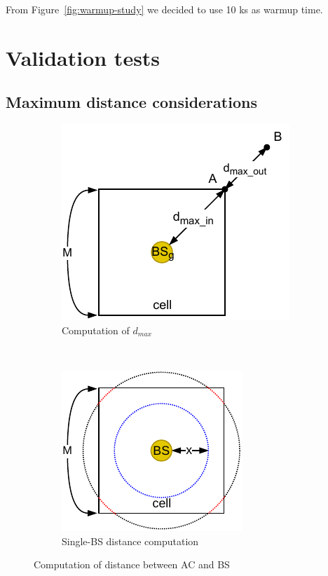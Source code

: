 \documentclass[a4paper,12pt]{article}
\begin{document}
From Figure~\ref{fig:warmup-study} we decided to use 10 ks as warmup time.

\section{Validation tests}
\subsection{Maximum distance considerations}
\label{sec:max-distance-considerations}
\begin{figure}[H]
  \centering
  \begin{subfigure}[b]{0.45\textwidth}
    \centering
    \includegraphics{img/dmax.pdf}
    \caption{Computation of $d_{max}$}
    \label{fig:dmax}
  \end{subfigure}
  ~
  \begin{subfigure}[b]{0.45\textwidth}
    \centering
    \includegraphics{img/d-simplified.pdf}
    \caption{Single-BS distance computation}
    \label{fig:d-simplified}
  \end{subfigure}
  \caption{Computation of distance between AC and BS}
  \label{fig:d}
\end{figure}
\end{document}
